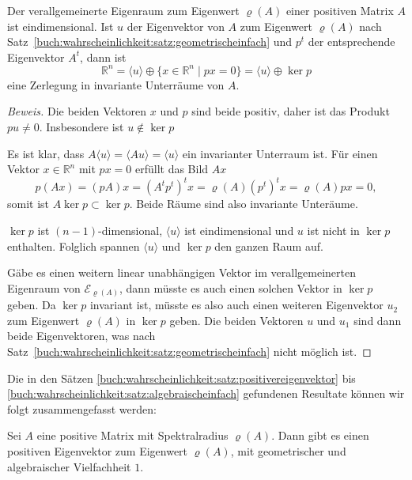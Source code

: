 \begin{satz}
\label{buch:wahrscheinlichkeit:satz:algebraischeinfach}
Der verallgemeinerte Eigenraum zum Eigenwert $\varrho(A)$ einer 
positiven Matrix $A$ ist eindimensional.
Ist $u$ der Eigenvektor von $A$ zum Eigenwert $\varrho(A)$ nach
Satz~\ref{buch:wahrscheinlichkeit:satz:geometrischeinfach}
und $p^t$ der entsprechende Eigenvektor $A^t$, dann
ist
\[
\mathbb{R}^n
=
\langle u\rangle
\oplus
\{ x\in\mathbb{R}^n\;|\; px=0\}
=
\langle u\rangle
\oplus
\ker p
\]
eine Zerlegung in invariante Unterräume von $A$.
\end{satz}

\begin{proof}[Beweis]
Die beiden Vektoren $x$ und $p$ sind beide positiv, daher ist das 
Produkt $pu\ne 0$.
Insbesondere ist $u\not\in\ker p$

Es ist klar, dass $A\langle u\rangle = \langle Au\rangle = \langle u\rangle$
ein invarianter Unterraum ist.
Für einen Vektor $x\in\mathbb{R}^n$ mit $px=0$ erfüllt das Bild $Ax$
\[
p(Ax)=(pA)x=(A^tp^t)^tx=
\varrho(A)(p^t)^tx
=
\varrho(A)px = 0,
\]
somit ist $A\ker p \subset \ker p$.
Beide Räume sind also invariante Unteräume.

$\ker p$ ist $(n-1)$-dimensional, $\langle u\rangle$ ist eindimensional
und $u$ ist nicht in $\ker p$ enthalten.
Folglich spannen $\langle u\rangle$ und $\ker p$ den ganzen Raum auf.

Gäbe es einen weitern linear unabhängigen Vektor im verallgemeinerten
Eigenraum von $\mathcal{E}_{\varrho(A)}$, dann müsste es auch einen
solchen Vektor in $\ker p$ geben.
Da $\ker p$ invariant ist, müsste es also auch einen weiteren Eigenvektor
$u_2$ zum Eigenwert $\varrho(A)$ in $\ker p$ geben.
Die beiden Vektoren $u$ und $u_1$ sind dann beide Eigenvektoren, was
nach Satz~\ref{buch:wahrscheinlichkeit:satz:geometrischeinfach}
nicht möglich ist.
\end{proof}

Die in den Sätzen
\ref{buch:wahrscheinlichkeit:satz:positivereigenvektor}
bis
\ref{buch:wahrscheinlichkeit:satz:algebraischeinfach}
gefundenen Resultate können wir folgt zusammengefasst werden:

\begin{satz}
Sei $A$ eine positive Matrix mit Spektralradius $\varrho(A)$.
Dann gibt es einen positiven Eigenvektor zum Eigenwert $\varrho(A)$,
mit geometrischer und algebraischer Vielfachheit $1$.
\end{satz}


